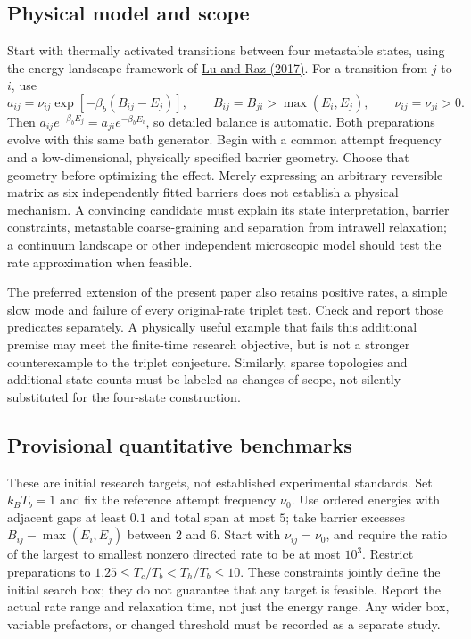 \documentclass[11pt]{article}
\begin{document}
\subsection{Physical model and scope}
Start with thermally activated transitions between four metastable states,
using the energy-landscape framework of
\href{https://pmc.ncbi.nlm.nih.gov/articles/PMC5441807/}{Lu and Raz (2017)}.
For a transition from $j$ to $i$, use
\[
 a_{ij}=\nu_{ij}\exp[-\beta_b(B_{ij}-E_j)],\qquad
 B_{ij}=B_{ji}>\max(E_i,E_j),\qquad \nu_{ij}=\nu_{ji}>0.
\]
Then $a_{ij}e^{-\beta_b E_j}=a_{ji}e^{-\beta_b E_i}$, so detailed balance
is automatic. Both preparations evolve with this same bath generator.
Begin with a common attempt frequency and a low-dimensional, physically
specified barrier geometry. Choose that geometry before optimizing the
effect. Merely expressing an arbitrary reversible matrix as six independently
fitted barriers does not establish a physical mechanism. A convincing
candidate must explain its state interpretation, barrier constraints,
metastable coarse-graining and separation from intrawell relaxation; a
continuum landscape or other independent microscopic model should test the
rate approximation when feasible.

The preferred extension of the present paper also retains positive rates,
a simple slow mode and failure of every original-rate triplet test.
Check and report those predicates separately. A physically useful example
that fails this additional premise may meet the finite-time research
objective, but is not a stronger counterexample to the triplet conjecture.
Similarly, sparse topologies and additional state counts must be labeled as
changes of scope, not silently substituted for the four-state construction.

\subsection{Provisional quantitative benchmarks}
These are initial research targets, not established experimental standards.
Set $k_B T_b=1$ and fix the reference attempt frequency $\nu_0$.
Use ordered energies with adjacent gaps at least $0.1$ and total span at most
$5$; take barrier excesses $B_{ij}-\max(E_i,E_j)$ between $2$ and $6$.
Start with $\nu_{ij}=\nu_0$, and require the ratio of the largest to smallest
nonzero directed rate to be at most $10^3$. Restrict preparations to
$1.25\leq T_c/T_b<T_h/T_b\leq10$.
These constraints jointly define the initial search box; they do not
guarantee that any target is feasible. Report the actual rate range and
relaxation time, not just the energy range. Any wider box, variable
prefactors, or changed threshold must be recorded as a separate study.
\end{document}
